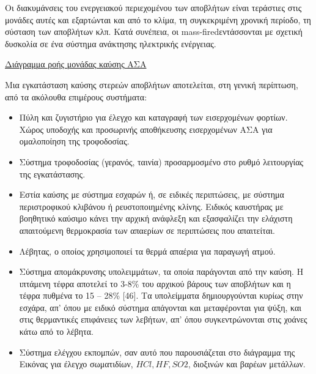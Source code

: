 \documentclass[12pt]{article}
\newcommand{\gr}{\selectlanguage{greek}}
\newcommand{\eng}{\selectlanguage{english}}
\begin{document}
	 Οι διακυμάνσεις του ενεργειακού περιεχομένου των αποβλήτων είναι τεράστιες στις μονάδες αυτές και εξαρτώνται και από το κλίμα, τη συγκεκριμένη χρονική περίοδο, τη σύσταση των αποβλήτων κλπ. Κατά συνέπεια, οι \eng mass-fired\gr εντάσσονται με σχετική δυσκολία σε ένα σύστημα ανάκτησης ηλεκτρικής ενέργειας.
	 
	 \underline{Διάγραμμα ροής μονάδας καύσης ΑΣΑ}
	 
	 Μια εγκατάσταση καύσης στερεών αποβλήτων αποτελείται, στη γενική περίπτωση, από τα ακόλουθα επιμέρους συστήματα: 
	 
	 \begin{itemize}
	 	\item Πύλη και ζυγιστήριο για έλεγχο και καταγραφή των εισερχομένων φορτίων. Χώρος υποδοχής και προσωρινής αποθήκευσης εισερχομένων ΑΣΑ για ομαλοποίηση της τροφοδοσίας.
	 	\item Σύστημα τροφοδοσίας (γερανός, ταινία) προσαρμοσμένο στο ρυθμό λειτουργίας της εγκατάστασης.
	 	\item Εστία καύσης με σύστημα εσχαρών ή, σε ειδικές περιπτώσεις, με σύστημα περιστροφικού κλιβάνου ή ρευστοποιημένης κλίνης. Ειδικός καυστήρας με βοηθητικό καύσιμο κάνει την αρχική ανάφλεξη και εξασφαλίζει την ελάχιστη απαιτούμενη θερμοκρασία των απαερίων σε περιπτώσεις που απαιτείται.
	 	\item Λέβητας, ο οποίος χρησιμοποιεί τα θερμά απαέρια για παραγωγή ατμού.
	 	\item Σύστημα απομάκρυνσης υπολειμμάτων, τα οποία παράγονται από την καύση. Η ιπτάμενη τέφρα αποτελεί το 3-8\% του αρχικού βάρους των αποβλήτων και η τέφρα πυθμένα το 15 – 28\% [46]. Τα υπολείμματα δημιουργούνται κυρίως στην εσχάρα, απ’ όπου με ειδικό σύστημα απάγονται και μεταφέρονται για ψύξη, και στις θερμαντικές επιφάνειες των λεβήτων, απ’ όπου συγκεντρώνονται στις χοάνες κάτω από το λέβητα.
	 	\item Σύστημα ελέγχου εκπομπών, σαν αυτό που παρουσιάζεται στο διάγραμμα της Εικόνας για έλεγχο σωματιδίων, $HCl, HF, SO2$, διοξινών και βαρέων μετάλλων.
	 \end{itemize}
 
\end{document}

